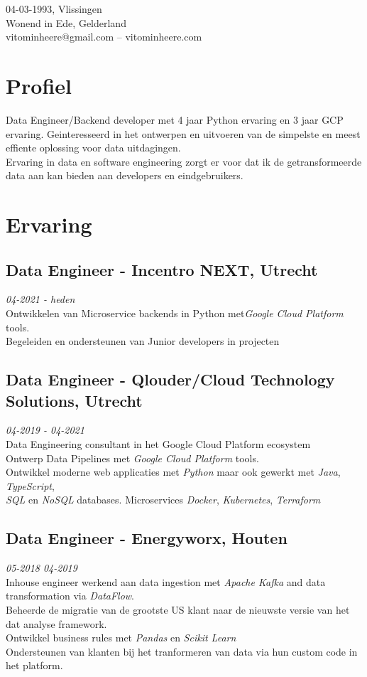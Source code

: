 \documentclass{article}
\makeatletter
\renewcommand{\maketitle}{
\begin{center}
	{\huge\bfseries
	\theauthor}

\vspace*{1cm}

04-03-1993, Vlissingen \\
Wonend in Ede, Gelderland \\
vitominheere@gmail.com -- vitominheere.com \\

\end{center}
}
\makeatother
\begin{document}
\author{Vito Minheere}


\maketitle

\section{\sc Profiel}
Data Engineer/Backend developer met 4 jaar Python ervaring en 3 jaar GCP ervaring. Geinteresseerd in het ontwerpen en uitvoeren van de simpelste en meest effiente oplossing voor data uitdagingen. \\
Ervaring in data en software engineering zorgt er voor dat ik de getransformeerde data aan kan bieden aan developers en eindgebruikers.

\section{\sc Ervaring}
\subsection{Data Engineer - Incentro NEXT, Utrecht} \hfill {\em 04-2021 - heden} \\
Ontwikkelen van Microservice backends in Python met\emph{Google Cloud Platform} tools. \\
Begeleiden en ondersteunen van Junior developers in projecten

\subsection{Data Engineer - Qlouder/Cloud Technology Solutions, Utrecht} \hfill {\em 04-2019 - 04-2021} \\
Data Engineering consultant in het Google Cloud Platform ecosystem \\
Ontwerp Data Pipelines met \emph{Google Cloud Platform} tools. \\
Ontwikkel moderne web applicaties met \emph{Python} maar ook gewerkt met \emph{Java}, \emph{TypeScript}, \\
\emph{SQL} en \emph{NoSQL} databases.
Microservices  \emph{Docker}, \emph{Kubernetes}, \emph{Terraform} \\

\subsection{Data Engineer - Energyworx, Houten} \hfill {\em 05-2018 04-2019} \\
Inhouse engineer werkend aan data ingestion met \emph{Apache Kafka} and data transformation via \emph{DataFlow}. \\
Beheerde de migratie van de grootste US klant naar de nieuwste versie van het dat analyse framework. \\
Ontwikkel business rules met \emph{Pandas} en \emph{Scikit Learn} \\
Ondersteunen van klanten bij het tranformeren van data via hun custom code in het platform. \\
\end{document}
